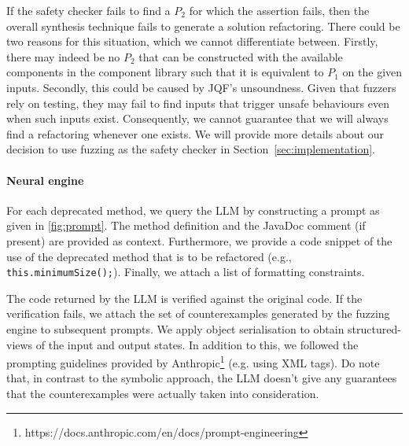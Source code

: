 \documentclass[sigconf]{acmart}
\begin{document}
If the safety checker fails to find a $P_2$ for which the assertion fails, then the overall synthesis technique fails to generate a solution refactoring.
There could be two reasons for this situation, which we cannot differentiate between.
Firstly, there may indeed be no $P_2$ that can be constructed with the available components in the component library such that
it is equivalent to $P_1$ on the given inputs. Secondly, this could be caused by JQF's unsoundness.
Given that fuzzers rely on testing, they may fail to find inputs that trigger unsafe behaviours even when such inputs exist.
Consequently, we cannot guarantee that we will always find a refactoring whenever one exists. We will provide more details about our decision to use fuzzing as the safety checker in
Section~\ref{sec:implementation}.


\paragraph{Neural engine}
%
For each deprecated method, we query the LLM by constructing a
prompt as given in \autoref{fig:prompt}.  The method definition and the
JavaDoc comment (if present) are provided as context.  Furthermore, we
provide a code snippet of the use of the deprecated method that is to be
refactored (e.g., \lstinline{this.minimumSize();}).  Finally, we attach a
list of formatting constraints.

The code returned by the LLM is verified against the original code.
If the verification fails, we attach the set of counterexamples generated by the fuzzing
engine to subsequent prompts. We apply object serialisation to obtain structured-views of the input and output states.
In addition to this, we followed the prompting guidelines provided by Anthropic\footnote{https://docs.anthropic.com/en/docs/prompt-engineering} (e.g. using XML tags).
Do note that, in contrast to the symbolic approach, the LLM doesn't give any guarantees that the counterexamples were actually taken into consideration.
\end{document}

